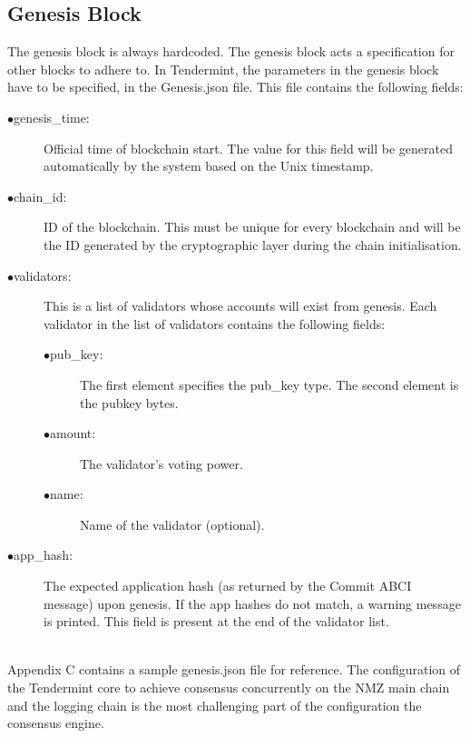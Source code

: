 \documentclass[a4paper,twoside,phd]{BYUPhys}
\begin{document}
\subsection{Genesis Block}
The genesis block is always hardcoded\cite{}. The genesis block acts a specification for other blocks to adhere to. In Tendermint, the parameters in the genesis block have to be specified, in the Genesis.json file. This file contains the following fields:
\begin{description}
\item[$\bullet$genesis\_time:]Official time of blockchain start. The value for this field will be generated automatically by the system based on the Unix timestamp.
\item[$\bullet$chain\_id:] ID of the blockchain. This must be unique for every blockchain and will be the ID generated by the cryptographic layer during the chain initialisation.
\item[$\bullet$validators:] This is a list of validators whose accounts will exist from genesis. Each validator in the list of validators contains the following fields:
\begin{description}
\item[$\bullet$pub\_key:]The first element specifies the pub\_key type. The second element is the pubkey bytes.
\item[$\bullet$amount:]The validator’s voting power.
\item[$\bullet$name:]Name of the validator (optional).
\end{description}

\item[$\bullet$app\_hash:]The expected application hash (as returned by the Commit ABCI message) upon genesis. If the app hashes do not match, a warning message is printed. This field is present at the end of the validator list.
\\
\\
\end{description}
Appendix C contains a sample genesis.json file for reference. The configuration of the Tendermint core to achieve consensus concurrently on the NMZ main chain and the logging chain is the most challenging part of the configuration the consensus engine.
\end{document}
